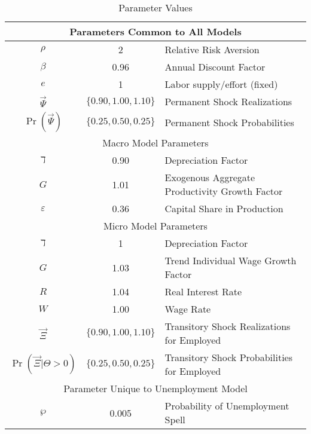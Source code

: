 
\begin{table}
\caption{Parameter Values}
\label{table:params}
\begin{center}
\begin{tabular}{ccl}
\hline \multicolumn{3}{c}{Parameters Common to All Models} 
\\ \hline
   $\rho$   & 2     & Relative Risk Aversion
\\ $\beta$  & 0.96  & Annual Discount Factor
\\ $e$      & 1 & Labor supply/effort (fixed)
\\ $\vec{\Psi}$   & $\{0.90,1.00,1.10\}$ & Permanent Shock Realizations
\\ $\Pr(\vec{\Psi})$ & $\{0.25,0.50,0.25\}$ & Permanent Shock Probabilities
\\ \hline \multicolumn{3}{c}{Macro Model Parameters}
\\ \hline 
   $\daleth$ & 0.90 & Depreciation Factor
\\ $G$       & 1.01  & Exogenous Aggregate Productivity Growth Factor
\\ $\varepsilon$  & 0.36  & Capital Share in Production
\\ \hline \multicolumn{3}{c}{Micro Model Parameters} 
\\ \hline 
   $\daleth$ & 1     & Depreciation Factor
\\ $G$       & 1.03  & Trend Individual Wage Growth Factor
\\ $R$       & 1.04  & Real Interest Rate
\\ $W$       & 1.00  & Wage Rate 
\\ $\vec{\Xi}$   & $\{0.90,1.00,1.10\}$ & Transitory Shock Realizations for Employed
\\ $\Pr(\vec{\Xi}|\Theta>0)$ & $\{0.25,0.50,0.25\}$ & Transitory Shock Probabilities for Employed
\\ \hline \multicolumn{3}{c}{Parameter Unique to Unemployment Model}
\\ \hline 
$\wp$       & 0.005 & Probability of Unemployment Spell
\end{tabular}
\end{center}
\end{table}




